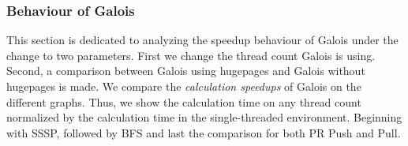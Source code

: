 

\subsubsection{Behaviour of Galois}


\label{sec:galois_speedup}
This section is dedicated to analyzing the speedup behaviour of Galois under the change to two parameters. First we change the thread count Galois is using. Second, a comparison between Galois using hugepages and Galois without hugepages is made.
We compare the \emph{calculation speedups} of Galois on the different graphs. Thus, we show the calculation time on any thread count normalized by the calculation time in the single-threaded environment.
Beginning with SSSP, followed by BFS and last the comparison for both PR Push and Pull.

